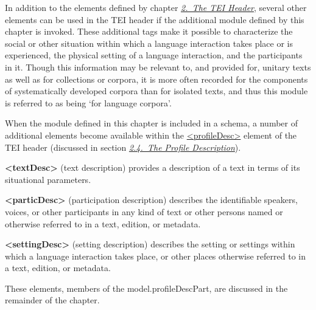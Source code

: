 In addition to the elements defined by chapter \textit{\hyperref[HD]{2.\ The TEI Header}}, several other elements can be used in the TEI header if the additional module defined by this chapter is invoked. These additional tags make it possible to characterize the social or other situation within which a language interaction takes place or is experienced, the physical setting of a language interaction, and the participants in it. Though this information may be relevant to, and provided for, unitary texts as well as for collections or corpora, it is more often recorded for the components of systematically developed corpora than for isolated texts, and thus this module is referred to as being ‘for language corpora’.\par
When the module defined in this chapter is included in a schema, a number of additional elements become available within the \hyperref[TEI.profileDesc]{<profileDesc>} element of the TEI header (discussed in section \textit{\hyperref[HD4]{2.4.\ The Profile Description}}). 
\begin{sansreflist}
  
\item [\textbf{<textDesc>}] (text description) provides a description of a text in terms of its situational parameters.
\item [\textbf{<particDesc>}] (participation description) describes the identifiable speakers, voices, or other participants in any kind of text or other persons named or otherwise referred to in a text, edition, or metadata.
\item [\textbf{<settingDesc>}] (setting description) describes the setting or settings within which a language interaction takes place, or other places otherwise referred to in a text, edition, or metadata.
\end{sansreflist}
 These elements, members of the \textsf{model.profileDescPart}, are discussed in the remainder of the chapter.
